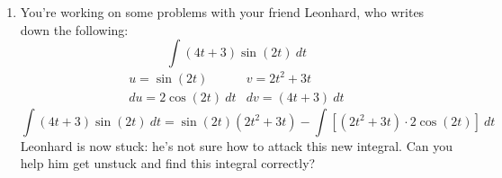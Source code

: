 \begin{enumerate}[leftmargin=0pt]
\begin{enumerate}
    \item $\int x^3\sin(x^4)\ dx$
    
    \begin{red}
    Ah ha, now we can use substitution. If $u = x^4$, then $\frac{du}{dx} = 4x^3$, so $dx = \frac{du}{4x^3}$.
    
    \begin{align*}
        \int x^3\sin(x^4)\ dx &= \int x^3 \sin(u)\ \frac{du}{4x^3} = \frac14 \int \sin(u)\ du = \frac14(\cos(u)) = -\frac14\cos(x^4)+ C
    \end{align*}
    \end{red}
    
    \item $\int x^7 \sin(x^4)\ dx = \int x^4\cdot (x^3\sin(x^4))\ dx$
    
    \begin{red}
    We'll use a similar trick as we did in part (b):
    \[\begin{array}{ll}
        u = x^4 &  \\
         & dv = x^3\sin(x^4)\ dx
    \end{array}
    \textrm{ so then }
    \begin{array}{ll}
        u = x^4 & \ \ v = -\tfrac14 \cos(x^4) \\
        du = 4x^3\ dx &  dv = x^3\sin(x^4)\ dx
    \end{array}
    \]
    Applying integration by parts:
    \begin{align*}
        \int x^4\cdot (x^3\sin(x^4))\ dx &= x^4 \cdot \left(-\tfrac14 \cos(x^4)\right) - \int -\tfrac14\cos(x^4)\cdot 4x^3\ dx \\
        &= -\tfrac14 x^4\cos(x^4) + \int x^3\cos(x^4)\ dx\\
        \intertext{We'll use the substitution $t = x^4$, $dt = 4x^3\ dx$ to evaluate the second integral.}
        &= -\frac14 x^4\cos(x^4) + \frac14 \int \cos(t)\ dt
         = -\frac14 x^4\cos(x^4) + \frac14 \sin(t) 
         = -\frac14 x^4\cos(x^4) + \frac14 \sin(x^4) + C
    \end{align*}
    \end{red}
\end{enumerate}


\item You're working on some problems with your friend Leonhard, who writes down the following:
\[\int (4t+3)\sin(2t)\ dt
\]
\[\begin{array}{ll}
    u = \sin(2t) & v = 2t^2 + 3t \\
    du = 2\cos(2t)\ dt & dv = (4t + 3)\ dt 
\end{array}
\]
\[\int (4t+3)\sin(2t)\ dt = \sin(2t)(2t^2+3t) - \int\left[(2t^2+3t)\cdot 2\cos(2t)\right]\ dt
\]
Leonhard is now stuck: he's not sure how to attack this new integral. Can you help him get unstuck and find this integral correctly?


\end{enumerate}

